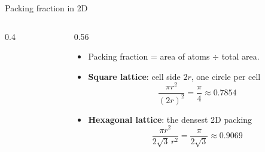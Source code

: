 \documentclass[aspectratio=169]{beamer}
\begin{document}
\begin{frame}[fragile]{Packing fraction in 2D}
  \begin{columns}[T]
    \begin{column}{0.4\textwidth}
      \begin{center}
      \end{center}
    \end{column}
    \begin{column}{0.56\textwidth}
      \begin{itemize}
        \item Packing fraction = area of atoms $\div$ total area.
        \item \textbf{Square lattice}: cell side $2r$, one circle per cell
              \[ \frac{\pi r^2}{(2r)^2} = \frac{\pi}{4} \approx 0.7854 \]
        \item \textbf{Hexagonal lattice}: the densest 2D packing
              \[ \frac{\pi r^2}{2\sqrt{3}\,r^2} = \frac{\pi}{2\sqrt{3}} \approx 0.9069 \]
      \end{itemize}
    \end{column}
  \end{columns}
\end{frame}
\end{document}

